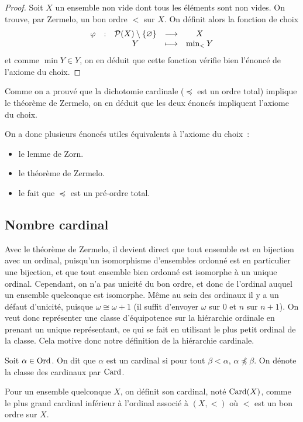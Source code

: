 \begin{proof}
  Soit $X$ un ensemble non vide dont tous les éléments sont non vides.
  On trouve, par Zermelo, un bon ordre $<$ sur $X$. On définit alors la
  fonction de choix
  \[\begin{array}{ccccc}
  \varphi & : & \mathcal{P}(X)\setminus\{\varnothing\} & \longrightarrow
  & X\\
  & & Y &\longmapsto & \min_{<} Y
  \end{array}\]
  et comme $\min Y\in Y$, on en déduit que cette fonction vérifie bien l'énoncé
  de l'axiome du choix.
\end{proof}

Comme on a prouvé que la dichotomie cardinale ($\preceq$ est un ordre total)
implique le théorème de Zermelo, on en déduit que les deux énoncés impliquent
l'axiome du choix.

On a donc plusieurs énoncés utiles équivalents à l'axiome du choix~:
\begin{itemize}
\item le lemme de Zorn.
\item le théorème de Zermelo.
\item le fait que $\preceq$ est un pré-ordre total.
\end{itemize}

\subsection{Nombre cardinal}

Avec le théorème de Zermelo, il devient direct que tout ensemble est en
bijection avec un ordinal, puisqu'un isomorphisme d'ensembles ordonné est en
particulier une bijection, et que tout ensemble bien ordonné est isomorphe à
un unique ordinal. Cependant, on n'a pas unicité du bon ordre, et donc de
l'ordinal auquel un ensemble quelconque est isomorphe. Même au sein des ordinaux
il y a un défaut d'unicité, puisque $\omega \cong \omega + 1$ (il suffit
d'envoyer $\omega$ sur $0$ et $n$ sur $n + 1$). On veut donc représenter une
classe d'équipotence sur la hiérarchie ordinale en prenant un unique
représentant, ce qui se fait en utilisant le plus petit ordinal de la classe.
Cela motive donc notre définition de la hiérarchie cardinale.

\begin{definition}[Cardinal]
  Soit $\alpha \in \operatorname{Ord}$. On dit que $\alpha$ est un cardinal si pour tout
  $\beta < \alpha$, $\alpha\not\preceq \beta$. On dénote la classe des cardinaux
  par $\operatorname{Card}$.

  Pour un ensemble quelconque $X$, on définit son cardinal, noté $\operatorname{Card}(X)$,
  comme le plus grand cardinal inférieur à l'ordinal associé à $(X,<)$ où $<$
  est un bon ordre sur $X$.
\end{definition}

